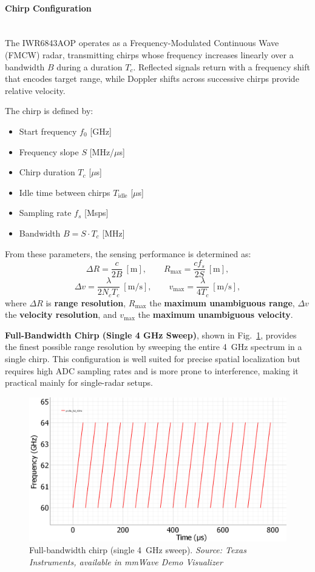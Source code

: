 \vspace{0.5em}
\paragraph{Chirp Configuration}
\hfill
\\
\indent The IWR6843AOP operates as a Frequency-Modulated Continuous Wave (FMCW) radar, transmitting chirps whose frequency increases linearly over a bandwidth $B$ during a duration $T_c$.  
Reflected signals return with a frequency shift that encodes target range, while Doppler shifts across successive chirps provide relative velocity.  

The chirp is defined by:
\begin{itemize}
    \item Start frequency $f_0$ [GHz]
    \item Frequency slope $S$ [MHz/$\mu$s]
    \item Chirp duration $T_c$ [$\mu$s]
    \item Idle time between chirps $T_{\text{idle}}$ [$\mu$s]
    \item Sampling rate $f_s$ [Msps]
    \item Bandwidth $B = S \cdot T_c$ [MHz]
\end{itemize}
From these parameters, the sensing performance is determined as:
\[
    \Delta R = \frac{c}{2B} \ [\text{m}], \qquad
    R_{\max} = \frac{c f_s}{2S} \ [\text{m}],
\]
\[
    \Delta v = \frac{\lambda}{2 N_c T_c} \ [\text{m/s}], \qquad
    v_{\max} = \frac{\lambda}{4 T_c} \ [\text{m/s}],
\]
where $\Delta R$ is \textbf{range resolution}, $R_{\max}$ the \textbf{maximum unambiguous range}, $\Delta v$ the \textbf{velocity resolution}, and $v_{\max}$ the \textbf{maximum unambiguous velocity}.  

\textbf{Full-Bandwidth Chirp (Single 4 GHz Sweep)}, shown in Fig.~\ref{fig:profile4GHz}, provides the finest possible range resolution by sweeping the entire 4~GHz spectrum in a single chirp.  
This configuration is well suited for precise spatial localization but requires high ADC sampling rates and is more prone to interference, making it practical mainly for single-radar setups.  

\begin{figure}[!htbp]
    \centering
    \includegraphics[width=0.7\linewidth]{images/profile_full_4GHz.png}
    \caption{Full-bandwidth chirp (single 4~GHz sweep).  
    \textit{Source: Texas Instruments, available in mmWave Demo Visualizer \cite{mmwave_demo_doc}}}
    \label{fig:profile4GHz}
\end{figure}

